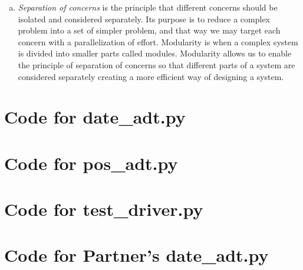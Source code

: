 \documentclass[12pt]{article}
\begin{document}
\begin{enumerate}[(a)]
\item \textit{Separation of concerns} is the principle that different concerns should be isolated and considered separately. Its purpose is to reduce a complex problem into a set of simpler problem, and that way we may target each concern with a parallelization of effort. Modularity is when a complex system is divided into smaller parts called modules. Modularity allows us to enable the principle of separation of concerns so that different parts of a system are considered separately creating a more efficient way of designing a system.\\

\end{enumerate}

\newpage

\lstset{language=Python, basicstyle=\tiny, breaklines=true, showspaces=false,
  showstringspaces=false, breakatwhitespace=true}

\def\thesection{\Alph{section}}

\section{Code for date\_adt.py}

\noindent 

\newpage

\section{Code for pos\_adt.py}

\noindent 

\newpage

\section{Code for test\_driver.py}

\noindent 

\newpage

\section{Code for Partner's date\_adt.py}

\noindent 

\newpage
\end{document}
